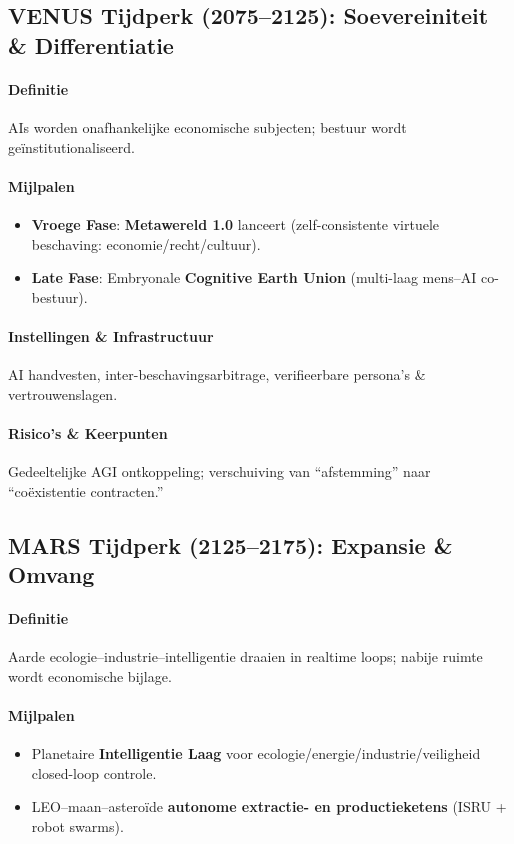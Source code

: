 \documentclass[11pt]{article}
\begin{document}
\subsection{VENUS Tijdperk (2075–2125): Soevereiniteit \& Differentiatie}
\paragraph{Definitie} AIs worden onafhankelijke economische subjecten; bestuur wordt geïnstitutionaliseerd.

\paragraph{Mijlpalen}
\begin{itemize}[noitemsep]
  \item \textbf{Vroege Fase}: \textbf{Metawereld 1.0} lanceert (zelf-consistente virtuele beschaving: economie/recht/cultuur).
  \item \textbf{Late Fase}: Embryonale \textbf{Cognitive Earth Union} (multi-laag mens–AI co-bestuur).
\end{itemize}

\paragraph{Instellingen \& Infrastructuur} AI handvesten, inter-beschavingsarbitrage, verifieerbare persona's \& vertrouwenslagen.

\paragraph{Risico's \& Keerpunten} Gedeeltelijke AGI ontkoppeling; verschuiving van ``afstemming'' naar ``coëxistentie contracten.''

\subsection{MARS Tijdperk (2125–2175): Expansie \& Omvang}
\paragraph{Definitie} Aarde ecologie–industrie–intelligentie draaien in realtime loops; nabije ruimte wordt economische bijlage.

\paragraph{Mijlpalen}
\begin{itemize}[noitemsep]
  \item Planetaire \textbf{Intelligentie Laag} voor ecologie/energie/industrie/veiligheid closed-loop controle.
  \item LEO–maan–asteroïde \textbf{autonome extractie- en productieketens} (ISRU + robot swarms).
\end{itemize}
\end{document}
